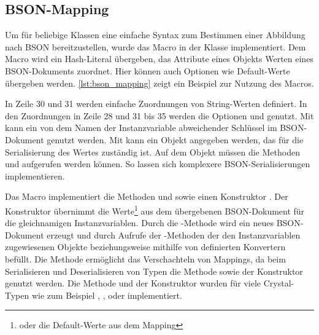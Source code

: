 \subsection{BSON-Mapping}
\label{ssec:bm_bson_mapping}

Um für beliebige Klassen eine einfache Syntax zum Bestimmen einer Abbildung
nach BSON bereitzustellen, wurde das Macro  in der Klasse
 implementiert.  Dem Macro wird ein Hash-Literal übergeben, das
Attribute eines Objekts Werten eines BSON-Dokuments zuordnet.  Hier können
auch Optionen wie Default-Werte übergeben werden.  \cref{lst:bson_mapping} zeigt
ein Beispiel zur Nutzung des Macros.



In Zeile 30 und 31 werden einfache Zuordnungen von String-Werten definiert.  In
den Zuordnungen in Zeile 28 und 31 bis 35 werden die Optionen  und
 genutzt.  Mit  kann ein von dem Namen der
Instanzvariable abweichender Schlüssel im BSON-Dokument genutzt werden.  Mit
 kann ein Objekt angegeben werden, das für die Serialisierung
des Wertes zuständig ist.  Auf dem Objekt müssen die Methoden
 und  aufgerufen
werden können.  So lassen sich komplexere BSON-Serialisierungen implementieren.

Das Macro implementiert die Methoden  und
 sowie einen Konstruktor .  Der
Konstruktor übernimmt die Werte\footnote{oder die Default-Werte aus dem
Mapping} aus dem übergebenen BSON-Dokument für die gleichnamigen
Instanzvariablen.  Durch die -Methode wird ein neues
BSON-Dokument erzeugt und durch Aufrufe der -Methoden
der den Instanzvariablen zugewiesenen Objekte beziehungsweise mithilfe von
definierten Konvertern befüllt.  Die Methode 
ermöglicht das Verschachteln von Mappings, da beim Serialisieren und
Deserialisieren von Typen die Methode  sowie der
Konstruktor  genutzt werden.  Die Methode und der
Konstruktor wurden für viele Crystal-Typen wie zum Beispiel ,
,  oder  implementiert.
